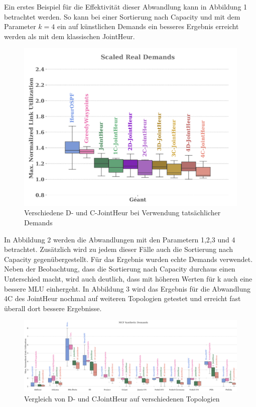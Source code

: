 \documentclass[sigconf]{acmart}
\begin{document}
Ein erstes Beispiel für die Effektivität dieser Abwandlung kann in Abbildung 1 betrachtet werden. So kann bei einer Sortierung nach Capacity und mit dem Parameter $k=4$ ein auf künstlichen Demands ein besseres Ergebnis erreicht werden als mit dem klassischen JointHeur. 
\begin{figure}[h]
  \centering 
  \includegraphics[width=\linewidth]{abbildungen/PNG-Bild 2}
  \caption{Verschiedene D- und C-JointHeur bei Verwendung tatsächlicher Demands}
\end{figure}
In Abbildung 2 werden die Abwandlungen mit den Parametern 1,2,3 und 4 betrachtet. Zusätzlich wird zu jedem dieser Fälle auch die Sortierung nach Capacity gegenübergestellt. Für das Ergebnis wurden echte Demands verwendet. Neben der Beobachtung, dass die Sortierung nach Capacity durchaus einen Unterschied macht, wird auch deutlich, dass mit höheren Werten für k auch eine bessere MLU einhergeht. In Abbildung 3 wird das Ergebnis für die Abwandlung 4C des JointHeur nochmal auf weiteren Topologien getestet und erreicht fast überall dort bessere Ergebnisse.
\begin{figure}[h]
  \centering 
  \includegraphics[width=\linewidth]{abbildungen/PNG-Bild 3}
  \caption{Vergleich von D- und CJointHeur auf verschiedenen Topologien}
\end{figure}
\end{document}
